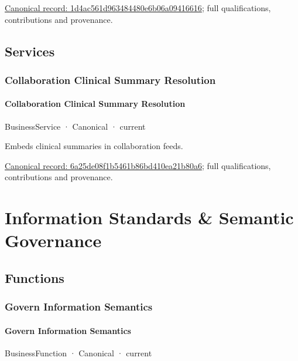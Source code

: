 {\footnotesize \href{../../../../continuum/business/business-function/1d4ac561d963484480e6b06a09416616.md}{Canonical record: 1d4ac561d963484480e6b06a09416616}; full qualifications, contributions and provenance.}\par
\subsection{Services}

\subsubsection{Collaboration Clinical Summary Resolution}

\paragraph{Collaboration Clinical Summary Resolution}

\label{element:6a25de08f1b5461b86bd410ea21b80a6}
{\small BusinessService · Canonical · current}\par

Embeds clinical summaries in collaboration feeds.


{\footnotesize \href{../../../../continuum/business/business-service/6a25de08f1b5461b86bd410ea21b80a6.md}{Canonical record: 6a25de08f1b5461b86bd410ea21b80a6}; full qualifications, contributions and provenance.}\par
\section{Information Standards \& Semantic Governance}

\subsection{Functions}

\subsubsection{Govern Information Semantics}

\paragraph{Govern Information Semantics}

\label{element:39a297b6c40c44ecba64857f6c3f3e0f}
{\small BusinessFunction · Canonical · current}\par

